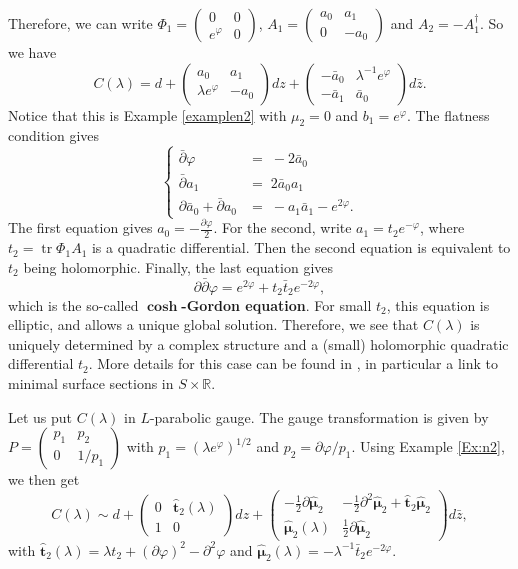 \documentclass[11pt]{amsart}
\numberwithin{thm}{section} %
\numberwithin{equation}{section} %
\numberwithin{figure}{section} %
\newcommand*{\R}{\mathbb{R}}
\renewcommand*{\S}{S}
\renewcommand*{\l}{\lambda}
\newcommand*{\del}{\partial}
\DeclareMathOperator{\tr}{tr}
\begin{document}
Therefore, we can write $\Phi_1 = \left(\begin{smallmatrix} 0 & 0 \\ e^{\varphi} & 0\end{smallmatrix}\right)$, $A_1 = \left(\begin{smallmatrix} a_0 & a_1 \\ 0 & -a_0\end{smallmatrix}\right)$ and $A_2 = -A_1^{\dagger}$. So we have 
$$C(\l)=d+\begin{pmatrix} a_0 & a_1 \\ \l e^{\varphi} & -a_0\end{pmatrix}dz+ \begin{pmatrix} -\bar{a}_0 & \l^{-1}e^{\varphi} \\ -\bar{a}_1 & \bar{a}_0\end{pmatrix}d\bar{z}.$$
Notice that this is Example \ref{examplen2} with $\mu_2=0$ and $b_1=e^{\varphi}$. The flatness condition gives 
$$ \left \{\begin{array}{cl}
\bar{\partial}\varphi &= \; -2\bar{a}_0 \\
\bar{\partial}a_1 &=\;  2\bar{a}_0a_1 \\
\partial \bar{a}_0+\bar{\partial}a_0 &= \; -a_1\bar{a}_1-e^{2\varphi}.
\end{array}\right. $$
The first equation gives $a_0=-\frac{\del \varphi}{2}$. For the second, write $a_1=t_2e^{-\varphi}$, where $t_2=\tr \Phi_1A_1$ is a quadratic differential. Then the second equation is equivalent to $t_2$ being holomorphic. Finally, the last equation gives $$\partial\bar{\partial} \varphi = e^{2\varphi} + t_2\bar{t}_2e^{-2\varphi},$$ which is the so-called $\boldsymbol{\cosh}$\textbf{-Gordon equation}. For small $t_2$, this equation is elliptic, and allows a unique global solution. Therefore, we see that $C(\l)$ is uniquely determined by a complex structure and a (small) holomorphic quadratic differential $t_2$. More details for this case can be found in \cite{Fock}, in particular a link to minimal surface sections in $\S\times \R$.

Let us put $C(\l)$ in $L$-parabolic gauge. The gauge transformation is given by $P=\left(\begin{smallmatrix} p_1& p_2 \\ 0& 1/p_1 \end{smallmatrix}\right)$ with $p_1=(\l e^{\varphi})^{1/2}$ and $p_2=\partial\varphi/p_1$. Using Example \ref{Ex:n2}, we then get
$$C(\l)\sim d+\begin{pmatrix}0&\bm\hat{t}_2(\l) \\1&0\end{pmatrix}dz+\begin{pmatrix}-\tfrac{1}{2}\partial\bm\hat{\mu}_2&-\tfrac{1}{2}\partial^2\bm\hat{\mu}_2+\bm\hat{t}_2\bm\hat{\mu}_2\\\bm\hat{\mu}_2(\l)&\tfrac{1}{2}\partial\bm\hat{\mu}_2\end{pmatrix}d\bar{z},$$
with $\bm\hat{t}_2(\l)=\l t_2+(\partial\varphi)^2-\partial^2\varphi$ and $\bm\hat{\mu}_2(\l)=-\l^{-1}\bar{t}_2e^{-2\varphi}$.
\end{document}
